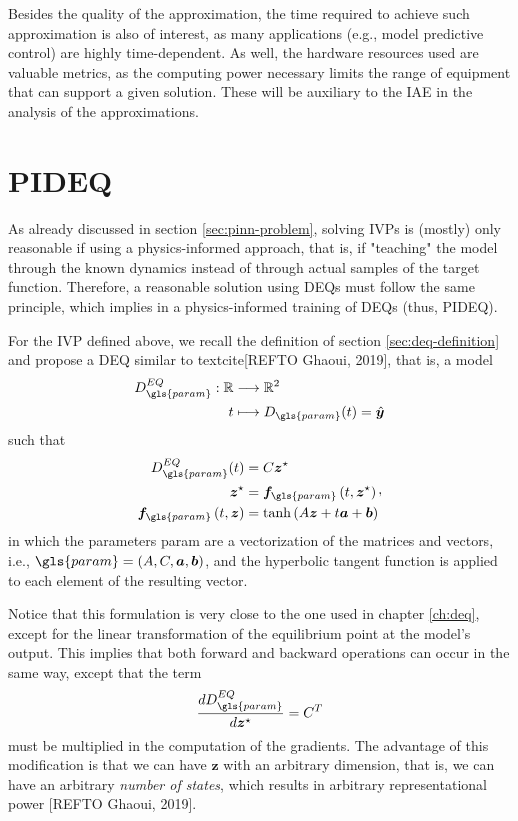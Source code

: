 Besides the quality of the approximation, the time required to achieve such approximation is also of interest, as many applications (e.g., model predictive control) are highly time-dependent.
As well, the hardware resources used are valuable metrics, as the computing power necessary limits the range of equipment that can support a given solution.
These will be auxiliary to the \gls{IAE} in the analysis of the approximations.

\section{PIDEQ}

As already discussed in section \ref{sec:pinn-problem}, solving \gls{IVP}s is (mostly) only reasonable if using a physics-informed approach, that is, if "teaching" the model through the known dynamics instead of through actual samples of the target function.
Therefore, a reasonable solution using \gls{DEQ}s must follow the same principle, which implies in a physics-informed training of \gls{DEQ}s (thus, \gls{PIDEQ}).

For the \gls{IVP} defined above, we recall the definition of section \ref{sec:deq-definition} and propose a \gls{DEQ} similar to textcite[REFTO Ghaoui, 2019], that is, a model
\begin{align*}
    D_{\gls{param}}^{EQ}: \R &\longrightarrow \R^2 \\
    t &\longmapsto D_{\gls{param}}(t) = \hat{\bm{y}}
\end{align*}
such that
\begin{equation}
\begin{split}
    D^{EQ}_{\gls{param}}(t) &= C\bm{z}^{\star} \\
    \bm{z}^{\star} &= \bm{f}_{\gls{param}}\left( t,\bm{z}^{\star} \right) \\
    \bm{f}_{\gls{param}}\left( t,\bm{z} \right) &= \tanh \left( A\bm{z} + t\bm{a} + \bm{b} \right)
\end{split}
,\end{equation}
in which the parameters \gls{param} are a vectorization of the matrices and vectors, i.e., $\gls{param} = \left( A,C,\bm{a},\bm{b} \right)$, and the hyperbolic tangent function is applied to each element of the resulting vector.

Notice that this formulation is very close to the one used in chapter \ref{ch:deq}, except for the linear transformation of the equilibrium point at the model's output.
This implies that both forward and backward operations can occur in the same way, except that the term  \[
    \frac{d D^{EQ}_{\gls{param}}}{d \bm{z}^{\star}} = C^T
\] must be multiplied in the computation of the gradients.
The advantage of this modification is that we can have $\bm{z}$ with an arbitrary dimension, that is, we can have an arbitrary \emph{number of states}, which results in arbitrary representational power [REFTO Ghaoui, 2019].

